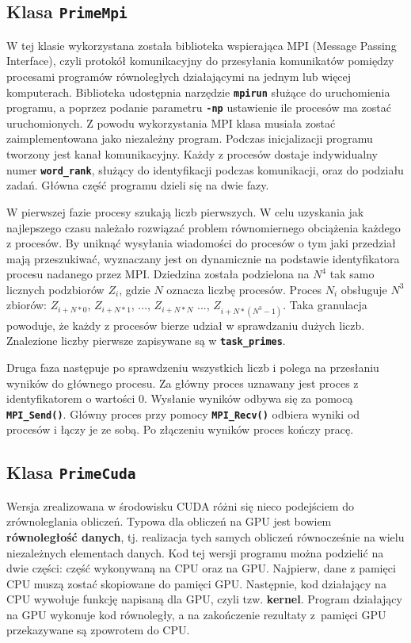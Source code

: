 \documentclass[12pt, twoside, hidelinks, a4paper]{article}
\begin{document}
\subsection{Klasa \textbf{\texttt{PrimeMpi}}}
W tej klasie wykorzystana została biblioteka wspierająca MPI (Message Passing Interface), czyli protokół komunikacyjny do przesyłania komunikatów pomiędzy procesami programów równoległych działającymi na jednym lub więcej komputerach.  Biblioteka udostępnia narzędzie \textbf{\texttt{mpirun}} służące do uruchomienia programu, a poprzez podanie parametru \textbf{\texttt{-np}} ustawienie ile procesów ma zostać uruchomionych. Z powodu wykorzystania MPI klasa musiała zostać zaimplementowana jako niezależny program. Podczas inicjalizacji programu tworzony jest kanał komunikacyjny. Każdy z procesów dostaje indywidualny numer \textbf{\texttt{word\_rank}}, służący do identyfikacji podczas komunikacji, oraz do podziału zadań. Główna część programu dzieli się na dwie fazy.

W pierwszej fazie procesy szukają liczb pierwszych. W celu uzyskania jak najlepszego czasu należało rozwiązać problem równomiernego obciążenia każdego z procesów. By uniknąć wysyłania wiadomości do procesów o tym jaki przedział mają przeszukiwać, wyznaczany jest on dynamicznie na podstawie identyfikatora procesu nadanego przez MPI. Dziedzina została podzielona na $N^4$ tak samo licznych podzbiorów $Z_i$, gdzie $N$ oznacza liczbę procesów. Proces $N_i$ obsługuje $N^3$ zbiorów: $Z_{i+N*0}$, $Z_{i+N*1}$, ..., $Z_{i + N*N}$ ..., $Z_{i+ N*(N^3-1)}$. Taka granulacja powoduje, że każdy z procesów bierze udział w sprawdzaniu dużych liczb. Znalezione liczby pierwsze zapisywane są w \textbf{\texttt{task\_primes}}.

Druga faza następuje po sprawdzeniu wszystkich liczb i polega na przesłaniu wyników do głównego procesu. Za główny proces uznawany jest proces z identyfikatorem o wartości $0$. Wysłanie wyników odbywa się za pomocą \textbf{\texttt{MPI\_Send()}}. Główny proces przy pomocy \textbf{\texttt{MPI\_Recv()}} odbiera wyniki od procesów i łączy je ze sobą. Po złączeniu wyników proces kończy pracę.

\subsection{Klasa \textbf{\texttt{PrimeCuda}}}
Wersja zrealizowana w środowisku CUDA różni się nieco podejściem do zrównoleglania obliczeń. Typowa dla obliczeń na GPU jest bowiem \textbf{równoległość danych}, tj. realizacja tych samych obliczeń równocześnie na wielu niezależnych elementach danych.
Kod tej wersji programu można podzielić na dwie części: część wykonywaną na CPU oraz na GPU. Najpierw, dane z pamięci CPU muszą zostać skopiowane do pamięci GPU. Następnie, kod działający na CPU wywołuje funkcję napisaną dla GPU, czyli tzw. \textbf{kernel}. Program działający na GPU wykonuje kod równoległy, a na zakończenie rezultaty z~pamięci GPU przekazywane są zpowrotem do CPU.
\end{document}
